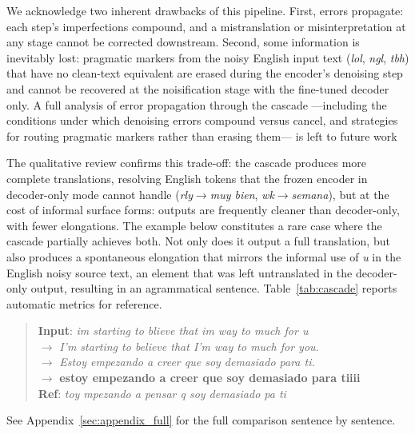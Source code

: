 \documentclass[11pt]{article}
\begin{document}
We acknowledge two inherent drawbacks of this pipeline.
First, errors propagate: each step's imperfections compound,
and a mistranslation or misinterpretation at any stage cannot
be corrected downstream. Second, some information is inevitably 
lost: pragmatic markers from the noisy English input text
(\textit{lol}, \textit{ngl}, \textit{tbh}) that have
no clean-text equivalent are erased during the encoder's denoising step
and cannot be recovered at the noisification stage with the fine-tuned decoder only.
A full analysis of error propagation through the cascade ---including the conditions under which denoising errors compound versus cancel, and strategies for routing pragmatic markers rather than erasing them--- is left to future work


The qualitative review confirms this trade-off:
the cascade produces more complete translations, resolving
English tokens that the frozen encoder in decoder-only mode
cannot handle (\textit{rly}$\rightarrow$\textit{muy bien},
\textit{wk}$\rightarrow$\textit{semana}), but at the cost of
informal surface forms: outputs are frequently cleaner than
decoder-only, with fewer elongations. The example below constitutes a rare case where the cascade partially achieves both. Not only does it output a full translation, but also produces a spontaneous elongation that mirrors the informal use of \textit{u} in the English noisy source text, an element that was left untranslated in the decoder-only output, resulting in an agrammatical sentence. Table~\ref{tab:cascade} reports automatic metrics for reference. 

\begin{quote}
\small
\textbf{Input}: \textit{im starting to blieve that im way to much for u} \\
$\rightarrow$ \textit{I'm starting to believe that I'm way to much for you.} \\
$\rightarrow$ \textit{Estoy empezando a creer que soy demasiado para ti.} \\
$\rightarrow$ \textbf{estoy empezando a creer que soy demasiado para tiiii} \\
\textbf{Ref}: \textit{toy mpezando a pensar q soy demasiado pa ti}
\end{quote}

\noindent


See Appendix~\ref{sec:appendix_full} for the full comparison sentence by sentence.
\end{document}
